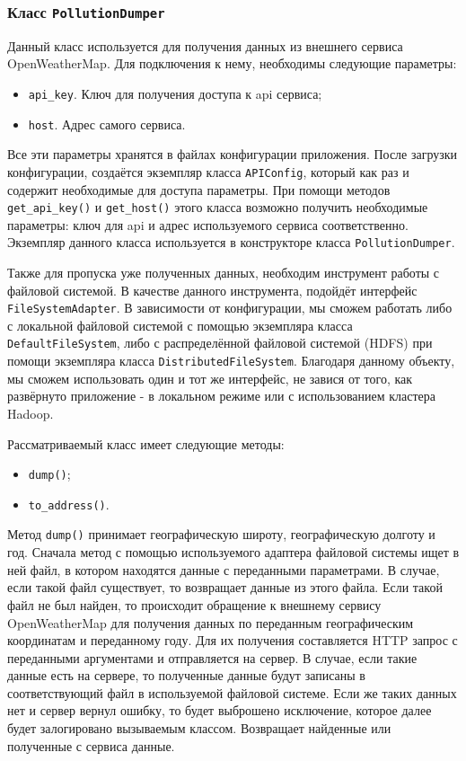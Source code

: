 \subsubsection{Класс \texttt{PollutionDumper}}
Данный класс используется для получения данных из внешнего сервиса OpenWeatherMap.
Для подключения к нему, необходимы следующие параметры:

\begin{itemize}
\item \texttt{api\_key}. Ключ для получения доступа к api сервиса;
\item \texttt{host}. Адрес самого сервиса.
\end{itemize}

Все эти параметры хранятся в файлах конфигурации приложения.
После загрузки конфигурации, создаётся экземпляр класса \texttt{APIConfig}, который как раз и содержит необходимые для доступа параметры.
При помощи методов \texttt{get\_api\_key()} и \texttt{get\_host()} этого класса возможно получить необходимые параметры: ключ для api и адрес используемого сервиса соответственно.
Экземпляр данного класса используется в конструкторе класса \texttt{PollutionDumper}.

Также для пропуска уже полученных данных, необходим инструмент работы с файловой системой.
В качестве данного инструмента, подойдёт интерфейс \texttt{FileSystemAdapter}.
В зависимости от конфигурации, мы сможем работать либо с локальной файловой системой с помощью экземпляра класса \texttt{DefaultFileSystem}, либо с распределённой файловой системой (HDFS) при помощи экземпляра класса \texttt{DistributedFileSystem}.
Благодаря данному объекту, мы сможем использовать один и тот же интерфейс, не завися от того, как развёрнуто приложение - в локальном режиме или с использованием кластера Hadoop.

Рассматриваемый класс имеет следующие методы:
\begin{itemize}
\item \texttt{dump()};
\item \texttt{to\_address()}.
\end{itemize}

Метод \texttt{dump()} принимает географическую широту, географическую долготу и год.
Сначала метод с помощью используемого адаптера файловой системы ищет в ней файл, в котором находятся данные с переданными параметрами.
В случае, если такой файл существует, то возвращает данные из этого файла.
Если такой файл не был найден, то происходит обращение к внешнему сервису OpenWeatherMap для получения данных по переданным географическим координатам и переданному году.
Для их получения составляется HTTP запрос с переданными аргументами и отправляется на сервер.
В случае, если такие данные есть на сервере, то полученные данные будут записаны в соответствующий файл в используемой файловой системе.
Если же таких данных нет и сервер вернул ошибку, то будет выброшено исключение, которое далее будет залогировано вызываемым классом.
Возвращает найденные или полученные с сервиса данные.


